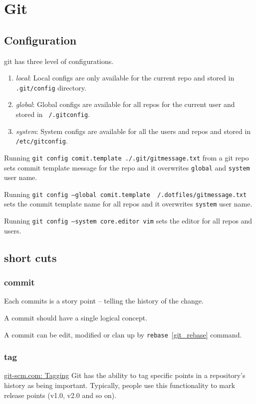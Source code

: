 \chapter{Git}

\section{Configuration}
git has three level of configurations.
\begin{enumerate}
  \item \textit{local}: Local configs are only available for the current repo and stored in \texttt{.git/config} directory.
  \item \textit{global}: Global configs are available for all repos for the current user and stored in \texttt{~/.gitconfig}.
  \item \textit{system}: System configs are available for all the users and repos and stored in \texttt{/etc/gitconfig}.
\end{enumerate}

Running \texttt{git config comit.template ./.git/gitmessage.txt} from a git repo sets commit template message for the repo and it overwrites \texttt{global} and \texttt{system} user name.


Running \texttt{git config --global comit.template ~/.dotfiles/gitmessage.txt} sets the commit template name for all repos and it overwrites \texttt{system} user name.


Running \texttt{git config --system core.editor vim} sets the editor for all repos and users.

\section{short cuts}

\subsection{commit}
Each commits is a story point -- telling the history of the change.

A commit should have a single logical concept.

A commit can be edit, modified or clan up by \texttt{rebase}~\ref{git_rebase} command.

\subsection{tag}
\href{https://git-scm.com/book/en/v2/Git-Basics-Tagging}{git-scm.com: Tagging}
Git has the ability to tag specific points in a repository’s history as being important. Typically, people use this functionality to mark release points (v1.0, v2.0 and so on).


